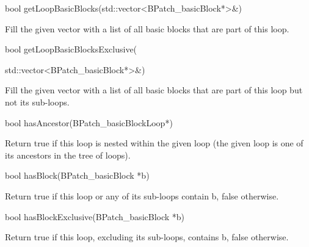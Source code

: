 {

bool getLoopBasicBlocks(std::vector<BPatch_basicBlock*>&)}



{

Fill the given vector with a list of all basic blocks that are part of this loop.}



{

bool getLoopBasicBlocksExclusive(}



{

std::vector<BPatch_basicBlock*>&)}



{

Fill the given vector with a list of all basic blocks that are part of this loop but not its sub-loops.}



{

bool hasAncestor(BPatch_basicBlockLoop*)}



{

Return true if this loop is nested within the given loop (the given loop is one of its ancestors in the tree of loops).}



{

bool hasBlock(BPatch_basicBlock *b)}



{

Return true if this loop or any of its sub-loops contain b, false otherwise.}



{

bool hasBlockExclusive(BPatch_basicBlock *b)}



{

Return true if this loop, excluding its sub-loops, contains b, false otherwise.}



